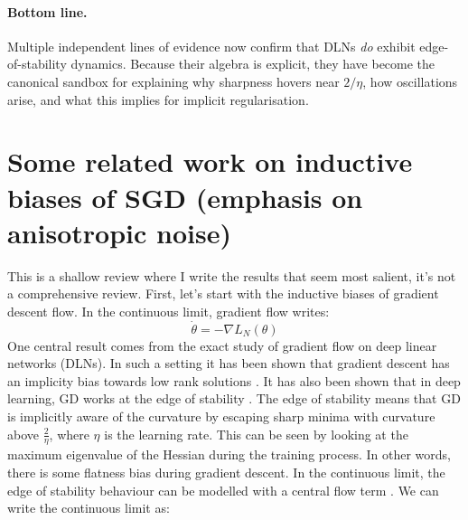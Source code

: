 \documentclass[11pt]{article}
\begin{document}
\paragraph{Bottom line.}
Multiple independent lines of evidence now confirm that DLNs \emph{do}
exhibit edge-of-stability dynamics.  Because their algebra is explicit,
they have become the canonical sandbox for explaining why sharpness
hovers near $2/\eta$, how oscillations arise, and what this implies for
implicit regularisation.


\section*{Some related work on inductive biases of SGD (emphasis on anisotropic noise)}
This is a shallow review where I write the results that seem most salient, it's not a comprehensive review. First, let's start with the inductive biases of gradient descent flow. In the continuous limit, gradient flow writes:
\begin{equation}
    \dot{\theta} = -\nabla L_N(\theta)
\end{equation}
One central result comes from the exact study of gradient flow on deep linear networks (DLNs). In such a setting it has been shown that gradient descent has an implicity bias towards low rank solutions \citep{saxe2013exact}. It has also been shown that in deep learning, GD works at the edge of stability \citep{cohen2021gradient}. The edge of stability means that GD is implicitly aware of the curvature by escaping sharp minima with curvature above $\frac{2}{\eta}$, where $\eta$ is the learning rate. This can be seen by looking at the maximum eigenvalue of the Hessian during the training process. In other words, there is some flatness bias during gradient descent. In the continuous limit, the edge of stability behaviour can be modelled with a central flow term \citep{cohen2024understanding}. We can write the continuous limit as:

\end{document}
